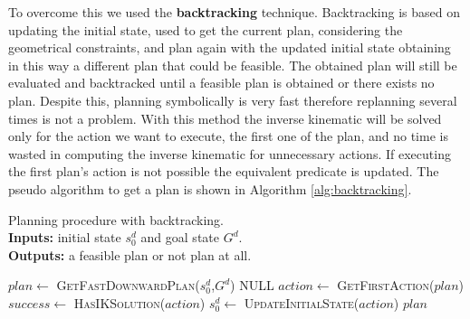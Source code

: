 To overcome this we used the \textbf{backtracking} technique\citep{Bidot2015}. Backtracking is based on updating the initial state, used to get the current plan, considering the geometrical constraints, and plan again with the updated initial state obtaining in this way a different plan that could be feasible. The obtained plan will still be evaluated and backtracked until a feasible plan is obtained or there exists no plan. Despite this, planning symbolically is very fast therefore replanning several times is not a problem. With this method the inverse kinematic will be solved only for the action we want to execute, the first one of the plan, and no time is wasted in computing the inverse kinematic for unnecessary actions. If executing the first plan's action is not possible the equivalent  predicate is updated. The pseudo algorithm to get a plan is shown in Algorithm \ref{alg:backtracking}.

\begin{algorithm}
\caption{Planning procedure with backtracking.\\
\textbf{Inputs:} initial state $s_{0}^d$ and goal state $G^d$. \\
\textbf{Outputs:} a feasible plan or not plan at all. }\label{alg:backtracking}
\begin{algorithmic}
\Repeat
  \State $plan \gets$ \textsc{GetFastDownwardPlan}($s_{0}^d$,$G^d$)
  		\Return NULL 
  \EndIf
  \State $action\gets$ \textsc{GetFirstAction}($plan$)
  \State $success \gets$ \textsc{HasIKSolution}($action$) 
    \State $s_{0}^d \gets$ \textsc{UpdateInitialState}($action$) 
  \EndIf
{}
\Return $plan$
\EndProcedure
\end{algorithmic}
\end{algorithm}  




